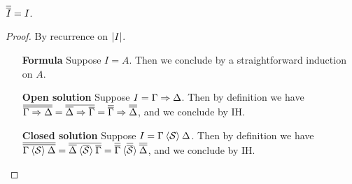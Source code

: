 \begin{lemma}[Involutivity]
  $\overline{\overline{I}} = I$.
\end{lemma}
\begin{proof}
  By recurrence on $\left|I\right|$.
  \begin{itemize}
    \item[\textbf{Formula}] Suppose $I = A$. Then we conclude by a
    straightforward induction on $A$.
    \item[\textbf{Open solution}] Suppose $I = \Gamma \Rightarrow \Delta$. Then by
    definition we have $\overline{\overline{\Gamma \Rightarrow \Delta}} =
    \overline{\overline{\Delta} \Rightarrow \overline{\Gamma}} =
    \overline{\overline{\Gamma}} \Rightarrow \overline{\overline{\Delta}}$, and we conclude
    by IH.
    \item[\textbf{Closed solution}] Suppose $I = \Gamma \mathbin{\langle \mathcal{S} \rangle}
    \Delta$. Then by definition we have $\overline{\overline{\Gamma
    \mathbin{\langle \mathcal{S} \rangle} \Delta}} = \overline{\overline{\Delta}
    \mathbin{\langle \overline{\mathcal{S}} \rangle} \overline{\Gamma}} =
    \overline{\overline{\Gamma}} \mathbin{\langle \overline{\overline{\mathcal{S}}} \rangle}
    \overline{\overline{\Delta}}$, and we conclude by IH.
  \end{itemize}
\end{proof}

